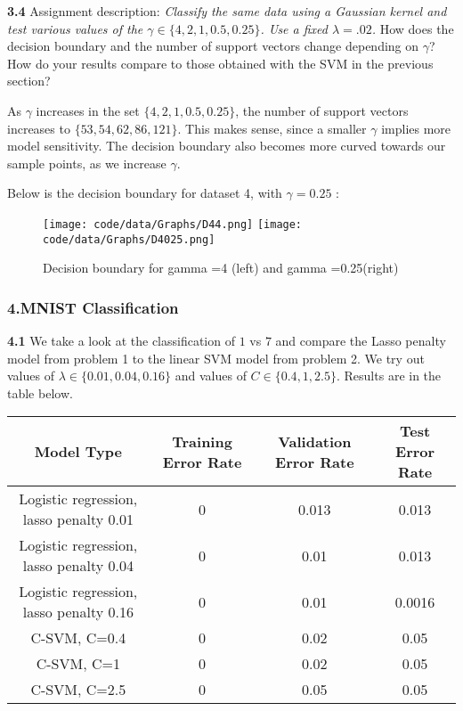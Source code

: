 \documentclass[10pt]{article}
\newcommand{\ds}{\displaystyle}
\begin{document}
\medskip

\textbf{3.4} Assignment description: \emph{Classify the same data using a Gaussian kernel and test various values of the $\ds \gamma \in \{4, 2, 1, 0.5, 0.25\}$. Use a fixed $\ds \lambda = .02$.}
How does the decision boundary and the number of support vectors change depending on $\ds\gamma$? How do
your results compare to those obtained with the SVM in the previous section?

As $\ds \gamma$ increases in the set $\ds \{4, 2, 1, 0.5, 0.25\}$, the number of support vectors increases to $\ds \{53, 54, 62, 86, 121\}$. This makes sense, since a smaller $\ds\gamma$ implies more model sensitivity. The decision boundary also becomes more curved towards our sample points, as we increase $\ds\gamma$.

Below is the decision boundary for dataset 4, with $\ds\gamma = 0.25$ :

\begin{figure}[!ht]
\texttt{[image: code/data/Graphs/D44.png]}
\texttt{[image: code/data/Graphs/D4025.png]}
\caption{Decision boundary for gamma =4 (left) and gamma =0.25(right)}
\end{figure}

\subsubsection*{4.MNIST Classification}

\textbf{4.1} We take a look at the classification of $\ds 1$ vs $\ds 7$ and compare the Lasso penalty model from problem 1 to the linear SVM model from problem 2. We try out values of $\ds \lambda \in \{0.01, 0.04, 0.16\}$ and values of $\ds C \in \{0.4, 1, 2.5\}$. Results are in the table below.
\begin{center}
 \begin{tabular}{||c c c c||} 
 \hline
 Model Type & Training Error Rate & Validation Error Rate & Test Error Rate \\ [0.5ex] 
 \hline\hline
 Logistic regression, lasso penalty 0.01 & 0 & 0.013 & 0.013 \\ 
 \hline
 Logistic regression, lasso penalty 0.04 & 0 & 0.01 & 0.013 \\
 \hline
 Logistic regression, lasso penalty 0.16 & 0 & 0.01 & 0.0016 \\
 \hline
 C-SVM, C=0.4 & 0 & 0.02 & 0.05 \\
\hline
C-SVM, C=1 & 0 & 0.02 & 0.05 \\
\hline
C-SVM, C=2.5 & 0 & 0.05 & 0.05 \\
 \hline
\end{tabular}
\end{center}
\end{document}
